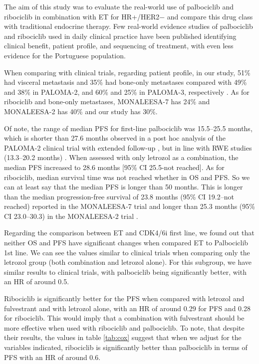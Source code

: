 The aim of this study was to evaluate the real-world use of palbociclib and ribociclib in combination with ET for HR+/HER2$-$ and compare this drug class with traditional endocrine therapy. Few real-world evidence studies of palbociclib and ribociclib used in daily clinical practice have been published identifying clinical benefit, patient profile, and sequencing of treatment, with even less evidence for the Portuguese population.

When comparing with clinical trials, regarding patient profile, in our study, 51\% had visceral metastasis and 35\% had bone-only metastases compared with 49\% and 38\% in PALOMA-2, and 60\% and 25\% in PALOMA-3, respectively \cite{rugoImpactPalbociclibLetrozole2018,cristofanilliFulvestrantPalbociclibFulvestrant2016a}.
As for ribociclib and bone-only metastases, MONALEESA-7 \cite{tripathyRibociclibEndocrineTherapy2018} has 24\% and MONALEESA-2 has 40\% \cite{hortobagyiUpdatedResultsMONALEESA22018} and our study has 30\%.



Of note, the range of median PFS for first-line palbociclib was 15.5–25.5 months, which is shorter than 27.6 months observed in a post hoc analysis of the PALOMA-2 clinical trial with extended follow-up \cite{rugoImpactPalbociclibLetrozole2018}, but in line with RWE studies (13.3–20.2 months) \cite{harbeckCDK4InhibitorsHR2021}. When assessed with only letrozol as a combination, the median PFS increased to 28.6 months [95\% CI 25.5-not reached].
As for ribociclib, median survival time was not reached whether in OS and PFS. So we can at least say that the median PFS is longer than 50 months. This is longer than the median progression-free survival of 23.8 months (95\% CI 19.2–not reached) reported in the MONALEESA-7 trial \cite{tripathyRibociclibEndocrineTherapy2018} and longer than  25.3 months (95\% CI 23.0–30.3) in the MONALEESA-2 trial \cite{hortobagyiUpdatedResultsMONALEESA22018}. 

Regarding the comparison between ET and CDK4/6i first line, we found out that neither OS and PFS have significant changes when compared ET to Palbociclib 1st line. We can see the values similar to clinical trials when comparing only the letrozol group (both combination and letrozol alone). For this subgroup, we have similar results to clinical trials, with palbociclib being significantly better, with an HR of around 0.5.

Ribociclib is significantly better for the PFS when compared with letrozol and fulvestrant and with letrozol alone, with an HR of around 0.29 for PFS and 0.28 for ribociclib.
This would imply that a combination with fulvestrant should be more effective when used with ribociclib and palbociclib.
To note, that despite their results, the values in table \ref*{tab:cox} suggest that when we adjust for the variables indicated, ribociclib is significantly better than palbociclib in terms of PFS with an HR of around 0.6.

